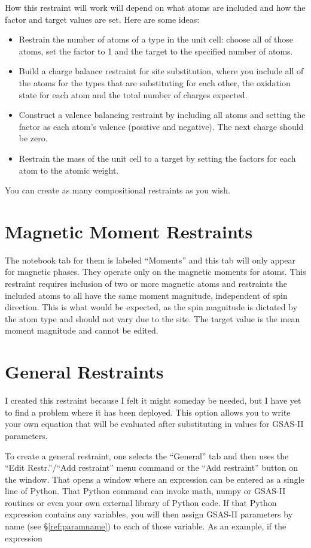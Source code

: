 How this restraint will work will depend on what atoms are included and how the factor and target values are set. Here are some ideas: 
\begin{itemize}
    \item Restrain the number of atoms of a type in the unit cell: choose all of those atoms, set the factor to 1 and the target to the specified number of atoms.
    \item Build a charge balance restraint for site substitution, where you include all of the atoms for the types that are substituting for each other, the oxidation state for each atom and the total number of charges expected.
    \item Construct a valence balancing restraint by including all atoms and setting the factor as each atom's valence (positive and negative). The next charge should be zero. 
    \item Restrain the mass of the unit cell to a target by setting the factors for each atom to the atomic weight. 
\end{itemize}
You can create as many compositional restraints as you wish. 

\section{Magnetic Moment Restraints}
The notebook tab for them is labeled ``Moments'' and this tab will only appear for magnetic phases. They operate only on the magnetic moments for atoms. This restraint requires inclusion of two or more magnetic atoms and restraints the included atoms to all have the same moment magnitude, independent of spin direction. This is what would be expected, as the spin magnitude is dictated by the atom type and should not vary due to the site. The target value is the mean moment magnitude and cannot be edited. 

\section{General Restraints}
I created this restraint because I felt it might someday be needed, but I have yet to find a problem where it has been deployed. This option allows you to write your own equation that will be evaluated after substituting in values for GSAS-II parameters. 

To create a general restraint, one selects the ``General'' tab and then uses the ``Edit Restr.''/``Add restraint'' menu command or the ``Add restraint'' button on the window. That opens a window where an expression can be entered as a single line of Python. That Python command can invoke math, numpy or GSAS-II routines or even your own external library of Python code. If that Python expression contains any variables, you will then assign GSAS-II parameters by name (see \S\ref{ref:paramname}) to each of those variable. As an example, if the expression 

